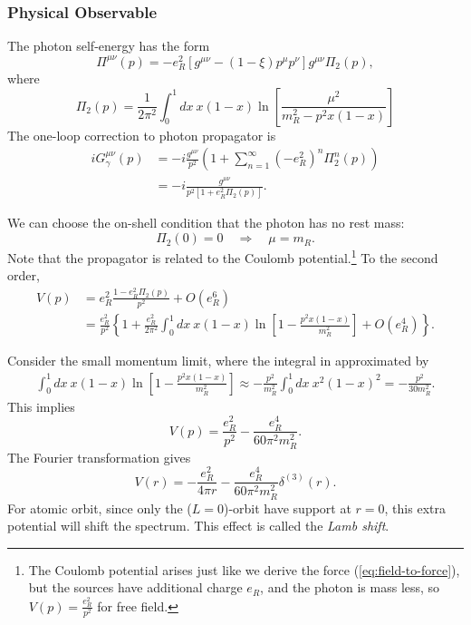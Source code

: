 \subsubsection{Physical Observable}

The photon self-energy has the form
\begin{equation}
	\Pi^{\mu\nu}(p) = -e_R^2 \left[g^{\mu\nu}-(1-\xi)p^\mu p^\nu\right] g^{\mu\nu} \Pi_2(p),
\end{equation}
where
\begin{equation}
	\Pi_2(p) = \frac{1}{2\pi^2} \int_0^1 dx\ x(1-x)
	\ln\left[\frac{\mu^2}{m_R^2-p^2 x(1-x)}\right]
\end{equation}
The one-loop correction to photon propagator is
\begin{equation}
\begin{aligned}
	iG^{\mu\nu}_\gamma(p) 
	&= -i \frac{g^{\mu\nu}}{p^2} \left(1 + \sum_{n=1}^\infty (-e_R^2)^n \Pi_2^n(p) \right) \\
	&= -i\frac{g^{\mu\nu}}{p^2 \left[1+e_R^2\Pi_2(p) \right]}.
\end{aligned}
\end{equation}

We can choose the on-shell condition that the photon has no rest mass:
\begin{equation}
	\Pi_2(0) = 0 \quad \Longrightarrow \quad
	\mu = m_R.
\end{equation}
Note that the propagator is related to the Coulomb potential.\footnote{The Coulomb potential arises just like we derive the force (\ref{eq:field-to-force}), but the sources have additional charge $e_R$, and the photon is mass less, so $V(p) = \frac{e_R^2}{p^2}$ for free field.
}
To the second order,
\begin{equation}
\begin{aligned}
	V(p) &= e_R^2 \frac{1-e_R^2 \Pi_2(p)}{p^2} + O(e_R^6) \\
	&= \frac{e_R^2}{p^2}\left\{1 + \frac{e_R^2}{2\pi^2}\int_0^1 dx\ x(1-x)\ln\left[1-\frac{p^2 x(1-x)}{m_R^2}\right] + O(e_R^4)\right\}.
\end{aligned}
\end{equation}

Consider the small momentum limit, where the integral in approximated by
\begin{equation}
\begin{aligned}
	\int_0^1 dx\ x(1-x)\ln\left[1-\frac{p^2 x(1-x)}{m_R^2}\right]
	\approx -\frac{p^2}{m_R^2} \int_0^1 dx\ x^2(1-x)^2 = -\frac{p^2}{30 m_R^2}.
\end{aligned}
\end{equation}
This implies
\begin{equation}
	V(p) = \frac{e_R^2}{p^2} - \frac{e_R^4}{60\pi^2 m_R^2}.
\end{equation}
The Fourier transformation gives
\begin{equation}
	V(r) = -\frac{e_R^2}{4\pi r} - \frac{e_R^4}{60\pi^2 m_R^2}\delta^{(3)}(r).
\end{equation}
For atomic orbit, since only the ($L=0$)-orbit have support at $r=0$, this extra potential will shift the spectrum.
This effect is called the \textit{Lamb shift}.


